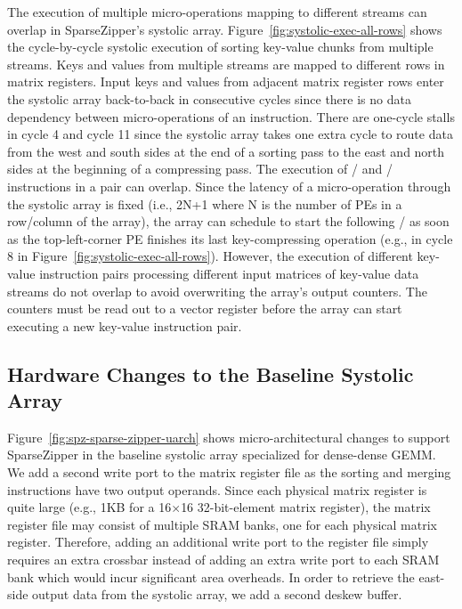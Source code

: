 The execution of multiple micro-operations mapping to different streams can
overlap in SparseZipper's systolic array.
Figure~\ref{fig:systolic-exec-all-rows} shows the cycle-by-cycle systolic
execution of sorting key-value chunks from multiple streams.
Keys and values from multiple streams are mapped to different rows in matrix
registers.
Input keys and values from adjacent matrix register rows enter the systolic
array back-to-back in consecutive cycles since there is no data dependency
between micro-operations of an instruction.
There are one-cycle stalls in cycle 4 and cycle 11 since the systolic array
takes one extra cycle to route data from the west and south sides at the end of
a sorting pass to the east and north sides at the beginning of a compressing
pass.
The execution of / and /
instructions in a pair can overlap.
Since the latency of a micro-operation through the systolic array is fixed
(i.e., 2N+1 where N is the number of PEs in a row/column of the array), the
array can schedule to start the following / as soon as
the top-left-corner PE finishes its last key-compressing operation (e.g., in
cycle 8 in Figure~\ref{fig:systolic-exec-all-rows}).
However, the execution of different key-value instruction pairs processing
different input matrices of key-value data streams do not overlap to avoid
overwriting the array's output counters.
The counters must be read out to a vector register before the array can start
executing a new key-value instruction pair.

\subsection{Hardware Changes to the Baseline Systolic Array}
\label{sec-spz-uarch-ext}


Figure~\ref{fig:spz-sparse-zipper-uarch} shows micro-architectural changes to
support SparseZipper in the baseline systolic array specialized for dense-dense
GEMM.
We add a second write port to the matrix register file as the sorting and
merging instructions have two output operands.
Since each physical matrix register is quite large (e.g., 1KB for a
16$\times$16 32-bit-element matrix register), the matrix register file may
consist of multiple SRAM banks, one for each physical matrix register.
Therefore, adding an additional write port to the register file simply requires
an extra crossbar instead of adding an extra write port to each SRAM bank which
would incur significant area overheads.
In order to retrieve the east-side output data from the systolic array, we add
a second deskew buffer.

